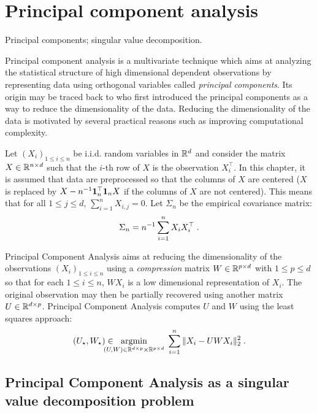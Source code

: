 \chapter{Principal component analysis}
\minitoc
\begin{kwd}
Principal components; singular value decomposition.
\end{kwd}

Principal component analysis is a multivariate technique which aims at analyzing the statistical structure of high dimensional dependent observations by representing data using orthogonal variables called {\em principal components}. Its origin may be traced back to \cite{hotelling:33} who first introduced the principal components as a way to reduce the dimensionality of the data. Reducing the dimensionality of the data is motivated by several practical reasons such as improving computational complexity.

Let $(X_i)_{1\leqslant i\leqslant n}$ be i.i.d. random variables in $\mathbb{R}^d$ and consider the matrix $X\in\mathbb{R}^{n\times d}$ such that the $i$-th row of $X$ is the observation $X^\top_i$. In this chapter, it is assumed that data are preprocessed so that the columns of $X$ are centered ($X$ is replaced by $X - n^{-1}\mathbf{1}^\top_n\mathbf{1}_nX$ if the columns of $X$ are not centered).  This means that for all $1\leqslant j \leqslant d$, $\sum_{i=1}^{n}X_{i,j} = 0$. Let $\Sigma_n$ be the empirical covariance matrix:
$$
\Sigma_n = n^{-1}\sum_{i=1}^n X_i X^\top_i\;.
$$

Principal Component Analysis  aims at reducing the dimensionality of the observations $(X_i)_{1\leqslant i \leqslant n}$ using a {\em compression} matrix $W\in \mathbb{R}^{p\times d}$ with $1\leqslant p\leqslant d$ so that for each $1\leqslant i \leqslant n$, $WX_i$ is a low dimensional representation of $X_i$. The original observation may then be partially recovered using another matrix $U\in \mathbb{R}^{d\times p}$. Principal Component Analysis  computes $U$ and $W$ using the least squares approach:
\begin{align*}
(U_{\star},W_{\star}) \in \hspace{-0.5cm}\underset{(U,W)\in \rset^{d\times p}\times \rset^{p\times d}}{\mathrm{argmin}} \;\sum_{i=1}^n\|X_i - UWX_i\|_2^2\eqsp.
\end{align*}



\section{Principal Component Analysis as a singular value decomposition problem}
\label{sec:pca:svd}
